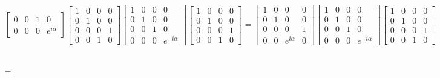 \documentclass[en]{sol-man}
\begin{document}
\begin{pf}
\begin{pf}
\begin{align}
\begin{bmatrix}
                0&0&1&0\\
                0&0&0&e^{i\alpha}
            \end{bmatrix}\begin{bmatrix}
                1&0&0&0\\
                0&1&0&0\\
                0&0&0&1\\
                0&0&1&0
            \end{bmatrix}\begin{bmatrix}
                1&0&0&0\\
                0&1&0&0\\
                0&0&1&0\\
                0&0&0&e^{-i\alpha}
            \end{bmatrix}\begin{bmatrix}
                1&0&0&0\\
                0&1&0&0\\
                0&0&0&1\\
                0&0&1&0
            \end{bmatrix}=\begin{bmatrix}
                1&0&0&0\\
                0&1&0&0\\
                0&0&0&1\\
                0&0&e^{i\alpha}&0
            \end{bmatrix}\begin{bmatrix}
                1&0&0&0\\
                0&1&0&0\\
                0&0&1&0\\
                0&0&0&e^{-i\alpha}
            \end{bmatrix}\begin{bmatrix}
                1&0&0&0\\
                0&1&0&0\\
                0&0&0&1\\
                0&0&1&0
            \end{bmatrix}\\
            =&\begin{bmatrix}
                1&0&0&0\\
                0&1&0&0\\
                0&0&0&e^{-i\alpha}\\
                0&0&e^{i\alpha}&0\\

\end{bmatrix}
\end{align}
\end{pf}
\end{pf}
\end{document}
